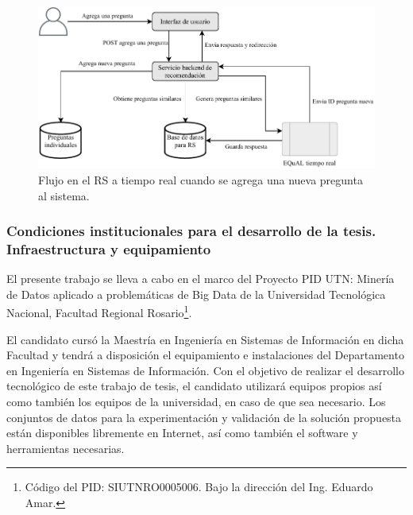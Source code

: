 \begin{figure}[h!]
	\centering
	\includegraphics[width=0.9\linewidth]{8_problema_investigacion/imagenes/implementacion_rs_agregar}
	\caption{Flujo en el RS a tiempo real cuando se agrega una nueva pregunta al sistema.}
	\label{fig:implementacionrsagregar}
\end{figure}

\subsubsection{Condiciones institucionales para el desarrollo de la tesis. Infraestructura y equipamiento}
El presente trabajo se lleva a cabo en el marco del Proyecto PID UTN: Minería de Datos aplicado a problemáticas de Big Data de la Universidad Tecnológica Nacional, Facultad Regional Rosario\footnote{Código del PID: SIUTNRO0005006. Bajo la dirección del Ing. Eduardo Amar.}.

\bigskip El candidato cursó la Maestría en Ingeniería en Sistemas de Información en dicha Facultad y tendrá a disposición el equipamiento e instalaciones del Departamento en Ingeniería en Sistemas de Información. Con el objetivo de realizar el desarrollo tecnológico de este trabajo de tesis, el candidato utilizará equipos propios así como también los equipos de la universidad, en caso de que sea necesario. Los conjuntos de datos para la experimentación y validación de la solución propuesta están disponibles libremente en Internet, así como también el software y herramientas necesarias.

















